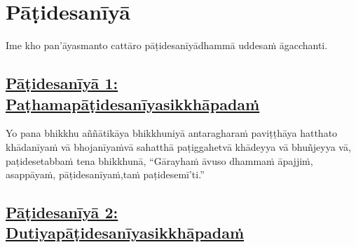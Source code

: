 
\section{Pāṭidesanīyā}
\label{pd}

\begin{intro}
	Ime kho pan'āyasmanto cattāro pāṭidesanīyā\makeatletter\hyperlink{endnote438-appendix}\makeatother \thinspace dhammā uddesaṁ āgacchanti.
\end{intro}

\setsubsecheadstyle{\subsubsectionFmtalt}
\subsection*{\hyperref[ack1]{Pāṭidesanīyā 1: Paṭhamapāṭidesanīyasikkhāpadaṁ}}
\label{pd1}

Yo pana bhikkhu aññātikāya bhikkhuniyā antaragharaṁ paviṭṭhāya hatthato khādanīyaṁ vā bhojanīyaṁ\makeatletter\hyperlink{endnote439-appendix}\makeatother \thinspace vā sahatthā paṭiggahetvā khādeyya vā bhuñjeyya vā, paṭidesetabbaṁ tena bhikkhunā, ``Gārayhaṁ āvuso dhammaṁ āpajjiṁ, asappāyaṁ, pāṭidesanīyaṁ,\makeatletter\hyperlink{endnote440-appendix}\makeatother \thinspace taṁ paṭidesemī'ti.''\makeatletter\hyperlink{endnote441-appendix}\makeatother \thinspace



\subsection*{\hyperref[ack2]{Pāṭidesanīyā 2: Dutiyapāṭidesanīyasikkhāpadaṁ}}
\label{pd2}

